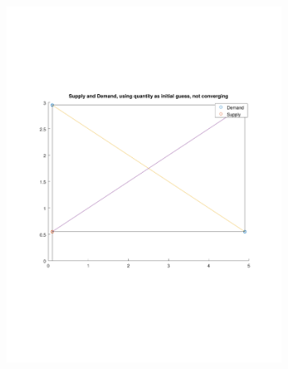 \documentclass{article}
\begin{document}

\begin{figure}[h!]
\centering
    \includegraphics[width=0.8\textwidth]{figure2}
\end{figure}
\end{document}
